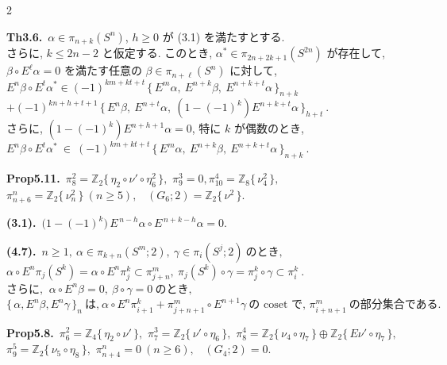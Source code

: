 \documentclass[10pt, leqno]{ltjsarticle}
\newcommand{\Ex}{E}        %
\newcommand{\todai}[2][]{\{\,#2\,\}_{#1}}      %
\newcommand{\gen}[1]{\{\,#1\,\}}       %
\newcommand{\pis}[2]{\pi_{#1}(#2)}       %
\newcommand{\pit}[2]{\pi_{#1}^{#2}}
\numberwithin{equation}{section}
\theoremstyle{plain}
\theoremstyle{definition}
\theoremstyle{remark}
\begin{document}
\begin{paracol}{2}
\switchcolumn

\noindent
\textbf{Th3.6.}\
$\alpha\in\pis{n+k}{S^{n}}$, $h\ge0$ が (3.1) を満たすとする.\\ 
さらに, $k\le 2n-2$ と仮定する.
このとき,
\(\alpha^{*}\in\pis{2n+2k+1}{S^{2n}}\)
が存在して, \\
\(\beta\circ \Ex^{\ell}\alpha=0\)
を満たす任意の $\beta\in\pis{n+\ell}{S^{n}}$ に対して, \\
\(\Ex^{n}\beta \circ \Ex^{t}\alpha^{*}
\in (-1)^{km+kt+t}\,\todai[n+k]{\Ex^{m}\alpha,\ 
  \Ex^{n+k}\beta,\ \Ex^{n+k+t}\alpha}\)\\
\(+ (-1)^{kn+h+t+1}\,\todai[h+t]{\Ex^{n}\beta,\ 
  \Ex^{n+t}\alpha,\ (1-(-1)^k)\Ex^{n+k+t}\alpha}\ .\)\\
さらに,
\((1-(-1)^k)\Ex^{n+h+1}\alpha=0\), 特に \(k\) が偶数のとき, \\
\(
\Ex^{n}\beta\circ \Ex^{t}\alpha^{*}\ \in\
(-1)^{km+kt+t}\,\todai[n+k]{\Ex^{m}\alpha,\ \Ex^{n+k}\beta,\ \Ex^{n+k+t}\alpha}\ .
\)

\noindent
\textbf{Prop5.11.}\
\(\pi^{2}_{8}=\mathbb Z_2\gen{\eta_{2}\circ\nu'\circ\eta_6^2},\)\quad 
\(\pi^{3}_{9}=0,\)\quad \(\pi^{4}_{10}=\mathbb Z_8\gen{\nu_{4}^2},\) \\
\(\pi^{n}_{n+6}=\mathbb Z_2\gen{\nu_n^2}\ (n\ge5),\) \
\((G_{6};2)=\mathbb Z_2\gen{\nu^2}.\)

\noindent
\textbf{(3.1).}\
\(\bigl(1-(-1)^k\bigr)\, \Ex^{\,n-h}\alpha \circ \Ex^{\,n+k-h}\alpha = 0.\)

\noindent
\textbf{(4.7).}\
\(n\ge1, \ \alpha\in\pis{k+n}{S^m; 2},\ \gamma\in\pis{i}{S^j; 2}
    \ \text{のとき, }\)\\
\(\alpha\circ E^n\pis{j}{S^k} = \alpha\circ E^n \pit{j}{k}
  \subset \pit{j+n}{m},
  \ \pis{j}{S^k}\circ\gamma = \pit{j}{k}\circ\gamma \subset\pit{i}{k}\ . \)\\
\(\text{さらに, }\ \alpha\circ E^n\beta=0,\ \beta\circ\gamma = 0 \ \text{のとき, }\)\\
\(\todai[n]{\alpha, E^n\beta, E^n\gamma}\ \text{は,}\
  \alpha\circ E^n\pit{i+1}{k} + \pit{j+n+1}{m}\circ E^{n+1}\gamma\
  \text{の coset で, }\pit{i+n+1}{m} \ \text{の部分集合である. }\)

\noindent
\textbf{Prop5.8.}\
\(\pi^{2}_{6}=\mathbb Z_4\gen{\eta_{2}\circ\nu'},\) \quad
\(\pi^{3}_{7}=\mathbb Z_2\gen{\nu'\circ\eta_6},\) \quad
\(\pi^{4}_{8}=\mathbb Z_2\gen{\nu_{4}\circ\eta_7}\oplus \mathbb Z_2\gen{E\nu'\circ\eta_7},\) \\
\(\pi^{5}_{9}=\mathbb Z_2\gen{\nu_{5}\circ\eta_8},\) \quad
\(\pi^{n}_{n+4}=0\ (n\ge6),\) \
\((G_{4};2)=0.\)


\end{paracol}
\end{document}
